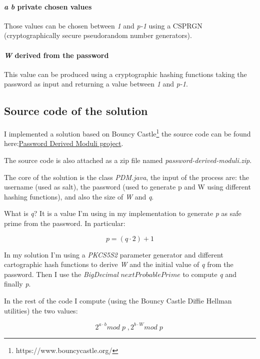 \documentclass{article}
\begin{document}
\paragraph{\emph{a} \emph{b} private chosen values}

Those values can be chosen between \emph{1} and \emph{p-1} using a CSPRGN
(cryptographically secure pseudorandom number generators).

\paragraph{\emph{W} derived from the password}

This value can be produced using a cryptographic hashing functions
taking the password as input and returning a value between \emph{1} and \emph{p-1}.

\subsection{Source code of the solution}

I implemented a solution based on Bouncy Castle\footnote{https://www.bouncycastle.org/} the source code
can be found here:\href{https://github.com/fax4ever/security-play/tree/main/password-derived-moduli}{Password Derived Moduli project}.

The source code is also attached as a zip file named \emph{password-derived-moduli.zip}.

The core of the solution is the class \emph{PDM.java}, the input of the process are:
the username (used as salt), the password (used to generate p and W using different hashing functions), and also the size of \emph{W} and \emph{q}.

What is \emph{q}? It is a value I'm using in my implementation to generate \emph{p} as safe prime from the password.
In particular:

\begin{equation}
p = (q \cdot 2) + 1
\end{equation}

In my solution I'm using a \emph{PKCS5S2} parameter generator and different cartographic hash functions
to derive \emph{W} and the initial value of \emph{q} from the password.
Then I use the \emph{BigDecimal} $nextProbablePrime$ to compute \emph{q} and finally \emph{p}.

In the rest of the code I compute (using the Bouncy Castle Diffie Hellman utilities)  the two values:

\begin{equation}
	2^{a \cdot b} mod \;  p \; , 2^{b \cdot W} mod \;  p \;
\end{equation}
\end{document}
